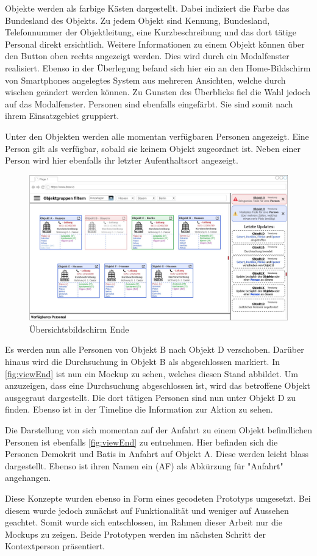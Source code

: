 Objekte werden als farbige Kästen dargestellt.
Dabei indiziert die Farbe das Bundesland des Objekts.
Zu jedem Objekt sind Kennung, Bundesland, Telefonnummer der Objektleitung, eine Kurzbeschreibung und das dort tätige Personal direkt ersichtlich.
Weitere Informationen zu einem Objekt können über den Button oben rechts angezeigt werden.
Dies wird durch ein Modalfenster realisiert.
Ebenso in der Überlegung befand sich hier ein an den Home-Bildschirm von Smartphones angelegtes System aus mehreren Ansichten, welche durch wischen geändert werden können.
Zu Gunsten des Überblicks fiel die Wahl jedoch auf das Modalfenster.
Personen sind ebenfalls eingefärbt.
Sie sind somit nach ihrem Einsatzgebiet gruppiert.

Unter den Objekten werden alle momentan verfügbaren Personen angezeigt.
Eine Person gilt als verfügbar, sobald sie keinem Objekt zugeordnet ist.
Neben einer Person wird hier ebenfalls ihr letzter Aufenthaltsort angezeigt.

\begin{figure}[htp]
    \centering
    \includegraphics[width=\textwidth]{images/1-MockupsV1/ViewScreenLessAfterMove.jpg}
    \caption{Übersichtsbildschirm Ende}
    \label{fig:viewEnd}
\end{figure}

Es werden nun alle Personen von Objekt B nach Objekt D verschoben.
Darüber hinaus wird die Durchsuchung in Objekt B als abgeschlossen markiert.
In \autoref{fig:viewEnd} ist nun ein Mockup zu sehen, welches diesen Stand abbildet.
Um anzuzeigen, dass eine Durchsuchung abgeschlossen ist, wird das betroffene Objekt ausgegraut dargestellt.
Die dort tätigen Personen sind nun unter Objekt D zu finden.
Ebenso ist in der Timeline die Information zur Aktion zu sehen.

Die Darstellung von sich momentan auf der Anfahrt zu einem Objekt befindlichen Personen ist ebenfalls \autoref{fig:viewEnd} zu entnehmen.
Hier befinden sich die Personen Demokrit und Batis in Anfahrt auf Objekt A. 
Diese werden leicht blass dargestellt.
Ebenso ist ihren Namen ein (AF) als Abkürzung für "Anfahrt" angehangen.

Diese Konzepte wurden ebenso in Form eines gecodeten Prototyps umgesetzt. 
Bei diesem wurde jedoch zunächst auf Funktionalität und weniger auf Aussehen geachtet.
Somit wurde sich entschlossen, im Rahmen dieser Arbeit nur die Mockups zu zeigen.
Beide Prototypen werden im nächsten Schritt der Kontextperson präsentiert.